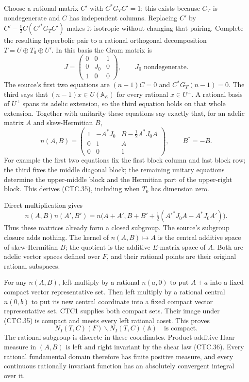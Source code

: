 Choose a rational matrix $C'$ with $C^*G_TC'=1$; this exists
because $G_T$ is nondegenerate and $C$ has independent columns.
Replacing $C'$ by $C'-\tfrac12C(C'^*G_TC')$ makes it isotropic
without changing that pairing.  Complete the resulting hyperbolic
pair to a rational orthogonal decomposition
$T=U\oplus T_0\oplus U'$.  In this basis the Gram matrix is
\[
       J=\begin{pmatrix}0&0&1\\0&J_0&0\\1&0&0\end{pmatrix},
                         \qquad J_0\text{ nondegenerate}.
 \tag{CTC.34}
\]
The source's first two equations are $(n-1)C=0$ and
$C^*G_T(n-1)=0$.  The third says that $(n-1)x\in U(\mathbb A_E)$
for every rational $x\in U^\perp$.  A rational basis of $U^\perp$
spans its adelic extension, so the third equation holds on that
whole extension.  Together with unitarity these equations say
exactly that, for an adelic matrix $A$ and skew-Hermitian $B$,
\[
 n(A,B)=
 \begin{pmatrix}
  1&-A^*J_0&B-\tfrac12 A^*J_0A\\
  0&1&A\\0&0&1
 \end{pmatrix},\qquad B^*=-B.
 \tag{CTC.35}
\]
For example the first two equations fix the first block column
and last block row; the third fixes the middle diagonal block;
the remaining unitary equations determine the upper-middle
block and the Hermitian part of the upper-right block.  This
derives (CTC.35), including when $T_0$ has dimension zero.

Direct multiplication gives
\[
 n(A,B)n(A',B')=
 n\bigl(A+A',B+B'+\tfrac12(A'^*J_0A-A^*J_0A')\bigr).
 \tag{CTC.36}
\]
Thus these matrices already form a closed subgroup.  The source's
subgroup closure adds nothing.  The kernel of $n(A,B)\mapsto A$
is the central additive space of skew-Hermitian $B$; the quotient
is the additive $E$-matrix space of $A$.  Both are adelic vector
spaces defined over $F$, and their rational points are their
original rational subspaces.

For any $n(A,B)$, left multiply by a rational $n(a,0)$ to put
$A+a$ into a fixed compact vector representative set.  Then left
multiply by a rational central $n(0,b)$ to put its new central
coordinate into a fixed compact vector representative set.
CTC1 supplies both compact sets.  Their image under (CTC.35)
is compact and meets every left rational coset.  This proves
\[
                     N_I(T,C)(F)\backslash N_I(T,C)(\mathbb A)
                              \quad\text{is compact}.
 \tag{CTC.37}
\]
The rational subgroup is discrete in these coordinates.
Product additive Haar measure in $(A,B)$ is left and right
invariant by the shear law (CTC.36).  Every rational fundamental
domain therefore has finite positive measure, and every continuous
rationally invariant function has an absolutely convergent
integral over it.

